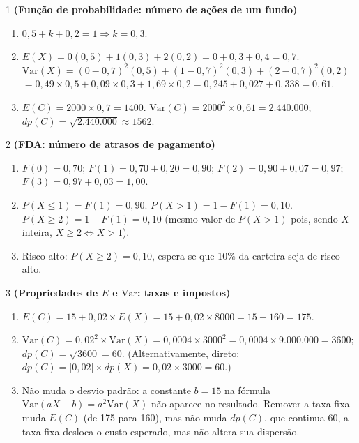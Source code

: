 \documentclass[11pt]{article}
\begin{document}

\begin{questao}{1} \textbf{(Função de probabilidade: número de ações de um fundo)}
\begin{solucao}
\begin{enumerate}[label=(\alph*)]
  \item $0{,}5+k+0{,}2=1 \Rightarrow k=0{,}3$.
  \item $E(X) = 0(0{,}5)+1(0{,}3)+2(0{,}2) = 0+0{,}3+0{,}4=0{,}7$.
    $\mathrm{Var}(X) = (0-0{,}7)^2(0{,}5)+(1-0{,}7)^2(0{,}3)+(2-0{,}7)^2(0{,}2)$
    $=0{,}49\times0{,}5+0{,}09\times0{,}3+1{,}69\times0{,}2 = 0{,}245+0{,}027+0{,}338=0{,}61$.
  \item $E(C)=2000\times0{,}7=1400$. $\mathrm{Var}(C)=2000^2\times0{,}61=2.440.000$;
    $dp(C)=\sqrt{2.440.000}\approx 1562$.
\end{enumerate}
\end{solucao}
\end{questao}

\begin{questao}{2} \textbf{(FDA: número de atrasos de pagamento)}
\begin{solucao}
\begin{enumerate}[label=(\alph*)]
  \item $F(0)=0{,}70$; $F(1)=0{,}70+0{,}20=0{,}90$; $F(2)=0{,}90+0{,}07=0{,}97$;
    $F(3)=0{,}97+0{,}03=1{,}00$.
  \item $P(X\le1)=F(1)=0{,}90$. $P(X>1)=1-F(1)=0{,}10$. $P(X\ge2)=1-F(1)=0{,}10$ (mesmo valor de
    $P(X>1)$ pois, sendo $X$ inteira, $X\ge 2 \Leftrightarrow X>1$).
  \item Risco alto: $P(X\ge2)=0{,}10$, espera-se que 10\% da carteira seja de risco alto.
\end{enumerate}
\end{solucao}
\end{questao}

\begin{questao}{3} \textbf{(Propriedades de $E$ e $\mathrm{Var}$: taxas e impostos)}
\begin{solucao}
\begin{enumerate}[label=(\alph*)]
  \item $E(C) = 15+0{,}02\times E(X) = 15+0{,}02\times8000 = 15+160=175$.
  \item $\mathrm{Var}(C) = 0{,}02^2\times\mathrm{Var}(X) = 0{,}0004\times 3000^2 = 0{,}0004\times
    9.000.000=3600$; $dp(C)=\sqrt{3600}=60$. (Alternativamente, direto:
    $dp(C)=|0{,}02|\times dp(X)=0{,}02\times3000=60$.)
  \item Não muda o desvio padrão: a constante $b=15$ na fórmula $\mathrm{Var}(aX+b)=a^2
    \mathrm{Var}(X)$ não aparece no resultado. Remover a taxa fixa muda $E(C)$ (de 175 para 160),
    mas não muda $dp(C)$, que continua $60$, a taxa fixa desloca o custo esperado, mas não altera
    sua dispersão.
\end{enumerate}
\end{solucao}
\end{questao}
\end{document}
